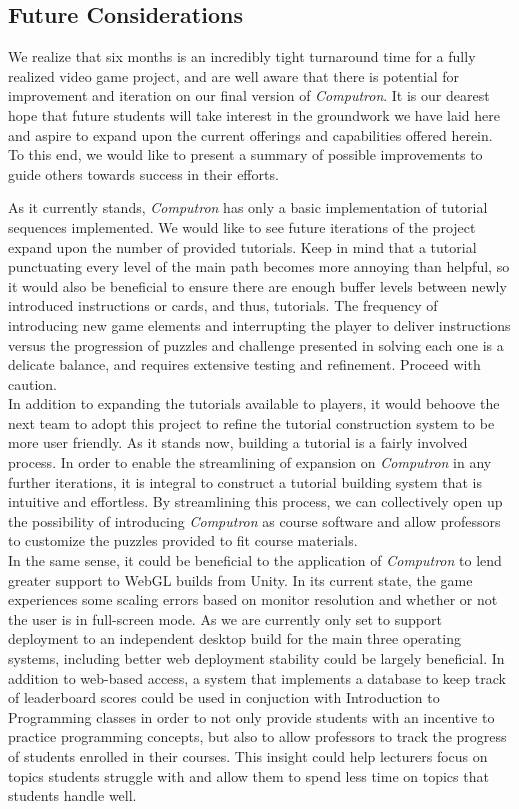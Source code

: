\subsection{Future Considerations}
We realize that six months is an incredibly tight turnaround time for a fully realized video game project, and are well aware that there is potential for improvement and iteration on our final version of \textit{Computron}. It is our dearest hope that future students will take interest in the groundwork we have laid here and aspire to expand upon the current offerings and capabilities offered herein. To this end, we would like to present a summary of possible improvements to guide others towards success in their efforts.

As it currently stands, \textit{Computron} has only a basic implementation of tutorial sequences implemented. We would like to see future iterations of the project expand upon the number of provided tutorials. Keep in mind that a tutorial punctuating every level of the main path becomes more annoying than helpful, so it would also be beneficial to ensure there are enough buffer levels between newly introduced instructions or cards, and thus, tutorials. The frequency of introducing new game elements and interrupting the player to deliver instructions versus the progression of puzzles and challenge presented in solving each one is a delicate balance, and requires extensive testing and refinement. Proceed with caution.\\

In addition to expanding the tutorials available to players, it would behoove the next team to adopt this project to refine the tutorial construction system to be more user friendly. As it stands now, building a tutorial is a fairly involved process. In order to enable the streamlining of expansion on \textit{Computron} in any further iterations, it is integral to construct a tutorial building system that is intuitive and effortless. By streamlining this process, we can collectively open up the possibility of introducing \textit{Computron} as course software and allow professors to customize the puzzles provided to fit course materials.\\

In the same sense, it could be beneficial to the application of \textit{Computron} to lend greater support to WebGL builds from Unity. In its current state, the game experiences some scaling errors based on monitor resolution and whether or not the user is in full-screen mode. As we are currently only set to support deployment to an independent desktop build for the main three operating systems, including better web deployment stability could be largely beneficial. In addition to web-based access, a system that implements a database to keep track of leaderboard scores could be used in conjuction with Introduction to Programming classes in order to not only provide students with an incentive to practice programming concepts, but also to allow professors to track the progress of students enrolled in their courses. This insight could help lecturers focus on topics students struggle with and allow them to spend less time on topics that students handle well.\\

